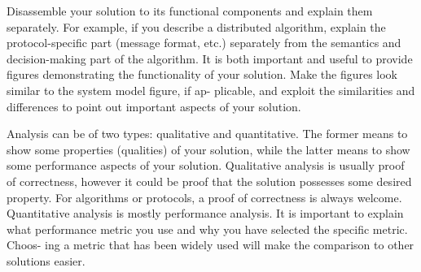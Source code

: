 Disassemble your solution to its functional components
and explain them separately. For example, if you describe
a distributed algorithm, explain the protocol-specific part
(message format, etc.) separately from the semantics and
decision-making part of the algorithm.
It is both important and useful to provide figures
demonstrating the functionality of your solution. Make
the figures look similar to the system model figure, if ap-
plicable, and exploit the similarities and differences to
point out important aspects of your solution.

Analysis can be of two types: qualitative and quantitative.
The former means to show some properties (qualities)
of your solution, while the latter means to show some
performance aspects of your solution.
Qualitative analysis is usually proof of correctness,
however it could be proof that the solution possesses some
desired property. For algorithms or protocols, a proof of
correctness is always welcome.
Quantitative analysis is mostly performance analysis.
It is important to explain what performance metric you
use and why you have selected the specific metric. Choos-
ing a metric that has been widely used will make the
comparison to other solutions easier.

